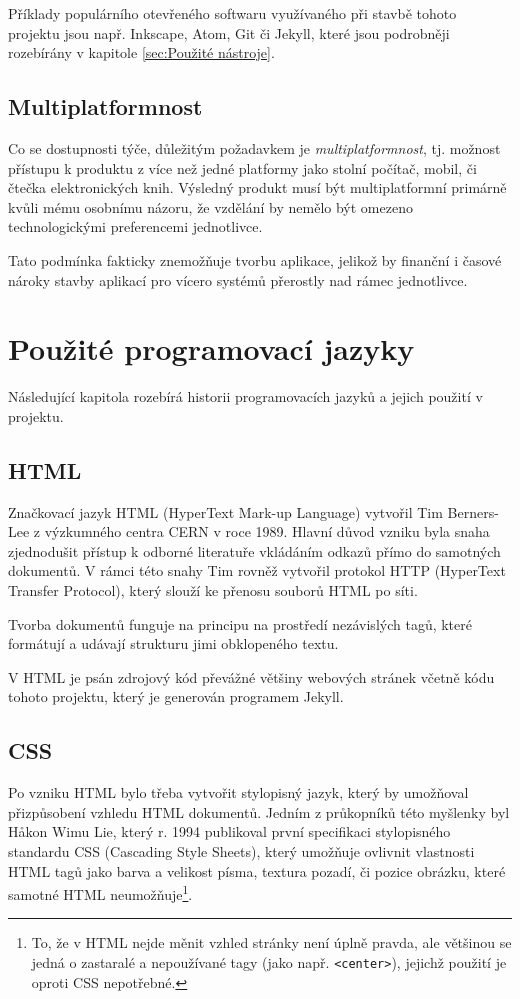 \documentclass[a4paper, 12pt]{article}
\begin{document}
  Příklady populárního otevřeného softwaru využívaného při stavbě tohoto projektu jsou např. Inkscape, Atom, Git či Jekyll, které jsou podrobněji rozebírány v kapitole \ref{sec:Použité nástroje}.


  \subsection{Multiplatformnost}
  Co se dostupnosti týče, důležitým požadavkem je \emph{multiplatformnost}, tj. možnost přístupu k produktu z více než jedné platformy jako stolní počítač, mobil, či čtečka elektronických knih. Výsledný produkt musí být multiplatformní primárně kvůli mému osobnímu názoru, že vzdělání by nemělo být omezeno technologickými preferencemi jednotlivce.

  Tato podmínka fakticky znemožňuje tvorbu aplikace, jelikož by finanční i časové nároky stavby aplikací pro vícero systémů přerostly nad rámec jednotlivce.


  \section{Použité programovací jazyky}
  Následující kapitola rozebírá historii programovacích jazyků a jejich použití v projektu.


  \subsection{HTML} \label{sec:HTML}
  Značkovací jazyk HTML (HyperText Mark-up Language) vytvořil Tim Berners-Lee z výzkumného centra CERN v roce 1989. Hlavní důvod vzniku byla snaha zjednodušit přístup k odborné literatuře vkládáním odkazů přímo do samotných dokumentů. V rámci této snahy Tim rovněž vytvořil protokol HTTP (HyperText Transfer Protocol), který slouží ke přenosu souborů HTML po síti\cite{html-history}.

  Tvorba dokumentů funguje na principu na prostředí nezávislých tagů, které formátují a udávají strukturu jimi obklopeného textu. %

  V HTML je psán zdrojový kód převážné většiny webových stránek včetně kódu tohoto projektu, který je generován programem Jekyll.


  \subsection{CSS} \label{sec:CSS}
  Po vzniku HTML bylo třeba vytvořit stylopisný jazyk, který by umožňoval přizpůsobení vzhledu HTML dokumentů. Jedním z průkopníků této myšlenky byl Håkon Wimu Lie, který r. 1994 publikoval první specifikaci stylopisného standardu CSS (Cascading Style Sheets)\cite{css-proposal, css-saga}, který umožňuje ovlivnit vlastnosti HTML tagů jako barva a velikost písma, textura pozadí, či pozice obrázku, které samotné HTML neumožňuje\footnote{To, že v HTML nejde měnit vzhled stránky není úplně pravda, ale většinou se jedná o zastaralé a nepoužívané tagy (jako např. \texttt{<center>}), jejichž použití je oproti CSS nepotřebné.}.
\end{document}
